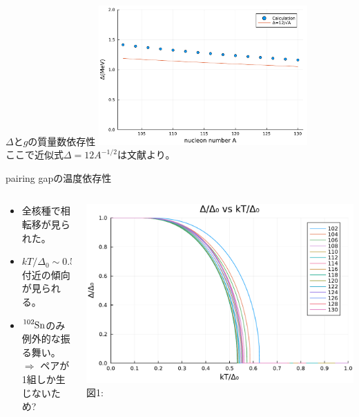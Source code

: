\documentclass[aspectratio=169, 12pt, dvipdfmx]{beamer}
\begin{document}
\begin{frame}{$\Delta$と$g$の質量数依存性}
  \centering
  \includegraphics[width=0.6\textwidth]{fig_pdf/Delta_vs_A.pdf}\\
  ここで近似式$\Delta=12A^{-1/2}$は文献\cite{nucleus_structure}より。
\end{frame}

\begin{frame}{pairing gapの温度依存性}
  \begin{columns}[totalwidth=1.0\linewidth]
    \begin{column}[t]{0.4\linewidth}
      \begin{itemize}
        \item 全核種で相転移が見られた。
        \item $kT/\Delta_0\sim0.55$付近の傾向が見られる。
        \item $\ce{{}^{102}Sn}$のみ例外的な振る舞い。\\$\Rightarrow$ ペアが1組しか生じないため?
      \end{itemize}
    \end{column}

    \begin{column}[T]{0.6\linewidth}
      \centering
      \includegraphics[width=\textwidth]{fig_pdf/Comp_FT_dT.pdf}
      \vspace{5pt} %
      \scriptsize 図1:
  \end{column}
  \end{columns}
\end{frame}
\end{document}
